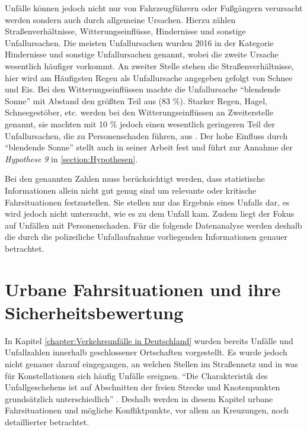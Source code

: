 Unfälle können jedoch nicht nur von Fahrzeugführern oder Fußgängern verursacht werden sondern auch durch allgemeine Ursachen. Hierzu zählen Straßenverhältnisse, Witterungseinflüsse, Hindernisse und sonstige Unfallursachen. Die meisten Unfallursachen wurden 2016 in der Kategorie Hindernisse und sonstige Unfallursachen genannt, wobei die zweite Ursache wesentlich häufiger vorkommt. An zweiter Stelle stehen die Straßenverhältnisse, hier wird am Häufigsten Regen als Unfallursache angegeben gefolgt von Schnee und Eis. Bei den Witterungseinflüssen machte die Unfallursache \enquote{blendende Sonne} mit Abstand den größten Teil aus (83 \%). Starker Regen, Hagel, Schneegestöber, etc. werden bei den Witterungseinflüssen an Zweiterstelle genannt, sie machten mit 10 \% jedoch einen wesentlich geringeren Teil der Unfallursachen, die zu Personenschaden führen, aus \parencite[S. 305]{StatistischesBundesamt.2018b}. Der hohe Einfluss durch \enquote{blendende Sonne} stellt auch \Textcite[S. 151]{Grundl.2005} in seiner Arbeit fest und führt zur Annahme der \textit{Hypothese 9} in \ref{section:Hypothesen}.

Bei den genannten Zahlen muss berücksichtigt werden, dass statistische Informationen allein nicht gut genug sind um relevante oder kritische Fahrsituationen festzustellen. Sie stellen nur das Ergebnis eines Unfalls dar, es wird jedoch nicht untersucht, wie es zu dem Unfall kam. Zudem liegt der Fokus auf Unfällen mit Personenschaden. Für die folgende Datenanalyse werden deshalb die durch die polizeiliche Unfallaufnahme vorliegenden Informationen genauer betrachtet. 

\section{Urbane Fahrsituationen und ihre Sicherheitsbewertung}\label{section:urbane Fahrsituationen und ihre Sicherheitsbewertung}
In Kapitel \ref{chapter:Verkehrsunfälle in Deutschland} wurden bereits Unfälle und Unfallzahlen innerhalb geschlossener Ortschaften vorgestellt. Es wurde jedoch nicht genauer darauf eingegangen, an welchen Stellen im Straßennetz und in was für Konstellationen sich häufig Unfälle ereignen. \enquote{Die Charakteristik des Unfallgeschehens ist auf Abschnitten der freien Strecke und Knotenpunkten grundsätzlich unterschiedlich} \parencite[S. 83]{Aurich.2015}. Deshalb werden in diesem Kapitel urbane Fahrsituationen und mögliche Konfliktpunkte, vor allem an Kreuzungen, noch detaillierter betrachtet.

